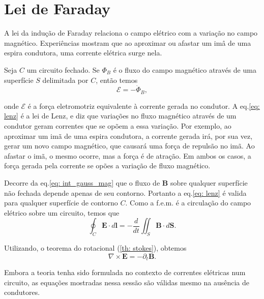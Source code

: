 \section{Lei de Faraday}

A lei da indução de Faraday relaciona o campo elétrico com a variação no campo magnético. Experiências mostram que ao aproximar ou afastar um imâ de uma espira condutora, uma corrente elétrica surge nela. 

Seja $C$ um circuito fechado. Se $\Phi_B$ é o fluxo do campo magnético através de uma superfície $S$ delimitada por $C$, então temos
\begin{equation}
\mathcal{E} = -\dot{\Phi}_B,
\label{eq: lenz}
\end{equation}

\noindent onde $\mathcal{E}$ é a força eletromotriz equivalente à corrente gerada no condutor. A eq.\eqref{eq: lenz} é a lei de Lenz, e diz que variações no fluxo magnético através de um condutor geram correntes que se opõem a essa variação. Por exemplo, ao aproximar um imã de uma espira condutora, a corrente gerada irá, por sua vez, gerar um novo campo magnético, que causará uma força de repulsão no imã. Ao afastar o imã, o mesmo ocorre, mas a força é de atração. Em ambos os casos, a força gerada pela corrente se opões a variação de fluxo magnético. 

Decorre da eq.\eqref{eq: int_gauss_mag} que o fluxo de $\mathbf{B}$ sobre qualquer superfície não fechada depende apenas de seu contorno. Portanto a eq.\eqref{eq: lenz} é valida para qualquer superfície de contorno $C$. Como a f.e.m. é a circulação do campo elétrico sobre um circuito, temos que 
\begin{equation}
\oint_C \mathbf{E} \cdot d\mathbf{l} = -\frac{d}{dt} \iint_S \mathbf{B} \cdot d\mathbf{S}.
\end{equation}

\noindent Utilizando, o teorema do rotacional (\ref{th: stokes}), obtemos 
\begin{equation}
\nabla \times \mathbf{E} = - \partial_t \mathbf{B}.
\label{eq: faraday}
\end{equation}

Embora a teoria tenha sido formulada no contexto de correntes elétricas num circuito, as equações mostradas nessa sessão são válidas mesmo na ausência de condutores. 

